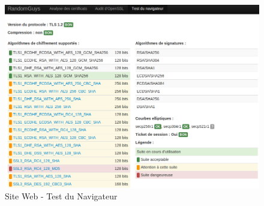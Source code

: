 \begin{figure}[H]
\begin{center}
\includegraphics[scale=0.5]{images/site_web_test_client.png}
\end{center}
\caption{Site Web - Test du Navigateur}
\label{test_client}
\end{figure}